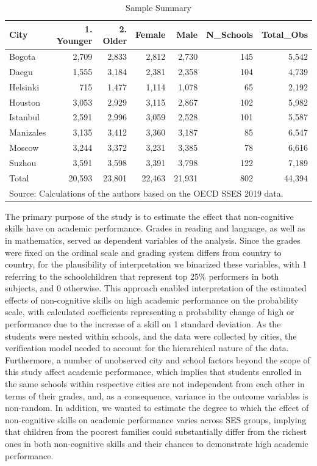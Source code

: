 \documentclass[
  12pt,
  a4paper,
]{article}
\begin{document}
\begin{table}

\caption{\label{tab:table-example}Sample Summary}
\centering
\begin{tabular}[t]{lrrrrrr}
\toprule
City & 1. Younger & 2. Older & Female & Male & N\_Schools & Total\_Obs\\
\midrule
Bogota & 2,709 & 2,833 & 2,812 & 2,730 & 145 & 5,542\\
Daegu & 1,555 & 3,184 & 2,381 & 2,358 & 104 & 4,739\\
Helsinki & 715 & 1,477 & 1,114 & 1,078 & 65 & 2,192\\
Houston & 3,053 & 2,929 & 3,115 & 2,867 & 102 & 5,982\\
Istanbul & 2,591 & 2,996 & 3,059 & 2,528 & 101 & 5,587\\
\addlinespace
Manizales & 3,135 & 3,412 & 3,360 & 3,187 & 85 & 6,547\\
Moscow & 3,244 & 3,372 & 3,231 & 3,385 & 78 & 6,616\\
Suzhou & 3,591 & 3,598 & 3,391 & 3,798 & 122 & 7,189\\
Total & 20,593 & 23,801 & 22,463 & 21,931 & 802 & 44,394\\
\bottomrule
\multicolumn{7}{l}{\rule{0pt}{1em}Source: Calculations of the authors based on the OECD SSES 2019 data.}\\
\end{tabular}
\end{table}

The primary purpose of the study is to estimate the effect that
non-cognitive skills have on academic performance. Grades in reading and
language, as well as in mathematics, served as dependent variables of
the analysis. Since the grades were fixed on the ordinal scale and
grading system differs from country to country, for the plausibility of
interpretation we binarized these variables, with 1 referring to the
schoolchildren that represent top 25\% performers in both subjects, and
0 otherwise. This approach enabled interpretation of the estimated
effects of non-cognitive skills on high academic performance on the
probability scale, with calculated coefficients representing a
probability change of high or performance due to the increase of a skill
on 1 standard deviation. As the students were nested within schools, and
the data were collected by cities, the verification model needed to
account for the hierarchical nature of the data. Furthermore, a number
of unobserved city and school factors beyond the scope of this study
affect academic performance, which implies that students enrolled in the
same schools within respective cities are not independent from each
other in terms of their grades, and, as a consequence, variance in the
outcome variables is non-random. In addition, we wanted to estimate the
degree to which the effect of non-cognitive skills on academic
performance varies across SES groups, implying that children from the
poorest families could substantially differ from the richest ones in
both non-cognitive skills and their chances to demonstrate high academic
performance.
\end{document}
